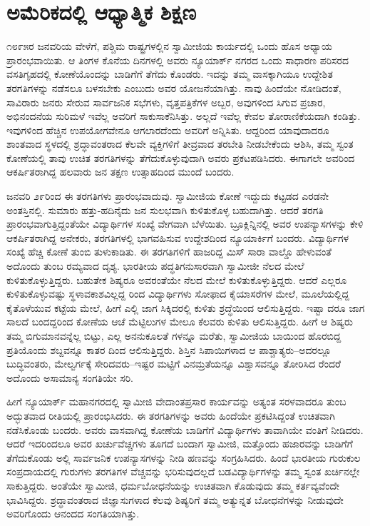 
\chapter{ಅಮೆರಿಕದಲ್ಲಿ ಆಧ್ಯಾತ್ಮಿಕ ಶಿಕ್ಷಣ}

\noindent

೧೮೯೫ರ ಜನವರಿಯ ವೇಳೆಗೆ, ಪಶ್ಚಿಮ ರಾಷ್ಟ್ರಗಳಲ್ಲಿನ ಸ್ವಾಮೀಜಿಯ ಕಾರ್ಯದಲ್ಲಿ ಒಂದು ಹೊಸ ಅಧ್ಯಾಯ ಪ್ರಾರಂಭವಾಯಿತು. ಆ ತಿಂಗಳ ಕೊನೆಯ ದಿನಗಳಲ್ಲಿ ಅವರು ನ್ಯೂಯಾರ್ಕ್ ನಗರದ ಒಂದು ಸಾಧಾರಣ ಪರಿಸರದ ವಸತಿಗೃಹದಲ್ಲಿ ಕೋಣೆಯೊಂದನ್ನು ಬಾಡಿಗೆಗೆ ತೆಗೆದು ಕೊಂಡರು. ಇದನ್ನು ತಮ್ಮ ವಾಸಕ್ಕಾಗಿಯೂ ಉದ್ದೇಶಿತ ತರಗತಿಗಳನ್ನು ನಡೆಸಲೂ ಬಳಸಬೇಕು ಎಂಬುದು ಅವರ ಯೋಜನೆಯಾಗಿತ್ತು. ನಾವು ಹಿಂದೆಯೇ ನೋಡಿದಂತೆ, ಸಾವಿರಾರು ಜನರು ಸೇರುವ ಸಾರ್ವಜನಿಕ ಸಭೆಗಳು, ವೃತ್ತಪತ್ರಿಕೆಗಳ ಅಬ್ಬರ, ಅವುಗಳಿಂದ ಸಿಗುವ ಪ್ರಚಾರ, ಅಭಿನಂದನೆಯ ಸುರಿಮಳೆ ಇವೆಲ್ಲ ಅವರಿಗೆ ಸಾಕುಸಾಕೆನಿಸಿತ್ತು. ಅಲ್ಲದೆ ಇವೆಲ್ಲ ಕೇವಲ ತೋರಾಣಿಕೆಯದಾಗಿ ಕಂಡಿತ್ತು. ಇವುಗಳಿಂದ ಹೆಚ್ಚಿನ ಉಪಯೋಗವೇನೂ ಆಗಲಾರದೆಂದು ಅವರಿಗೆ ಅನ್ನಿಸಿತು. ಆದ್ದರಿಂದ ಯಾವುದಾದರೂ ಶಾಂತವಾದ ಸ್ಥಳದಲ್ಲಿ ಶ್ರದ್ಧಾವಂತರಾದ ಕೆಲವೇ ವ್ಯಕ್ತಿಗಳಿಗೆ ತೀವ್ರವಾದ ತರಬೇತಿ ನೀಡಬೇಕೆಂದು ಆಶಿಸಿ, ತಮ್ಮ ಸ್ವಂತ ಕೋಣೆಯಲ್ಲಿ ತಾವು ಉಚಿತ ತರಗತಿಗಳನ್ನು ತೆಗೆದುಕೊಳ್ಳುವುದಾಗಿ ಅವರು ಪ್ರಕಟಪಡಿಸಿದರು. ಈಗಾಗಲೇ ಅವರಿಂದ ಆಕರ್ಷಿತರಾಗಿದ್ದ ಹಲವಾರು ಜನ ತಕ್ಷಣ ಉತ್ಸಾಹದಿಂದ ಮುಂದೆ ಬಂದರು.

ಜನವರಿ ೨೯ರಿಂದ ಈ ತರಗತಿಗಳು ಪ್ರಾರಂಭವಾದುವು. ಸ್ವಾಮೀಜಿಯ ಕೋಣೆ ಇದ್ದುದು ಕಟ್ಟಡದ ಎರಡನೇ ಅಂತಸ್ತಿನಲ್ಲಿ. ಸುಮಾರು ಹತ್ತು-ಹದಿನೈದು ಜನ ಸುಲಭವಾಗಿ ಕುಳಿತುಕೊಳ್ಳ ಬಹುದಾಗಿತ್ತು. ಆದರೆ ತರಗತಿ ಪ್ರಾರಂಭವಾಗುತ್ತಿದ್ದಂತೆಯೇ ವಿದ್ಯಾರ್ಥಿಗಳ ಸಂಖ್ಯೆ ವೇಗವಾಗಿ ಬೆಳೆಯಿತು. ಬ್ರೂಕ್ಲಿನ್ನಿನಲ್ಲಿ ಅವರ ಉಪನ್ಯಾಸಗಳನ್ನು ಕೇಳಿ ಆಕರ್ಷಿತರಾಗಿದ್ದ ಅನೇಕರು, ತರಗತಿಗಳಲ್ಲಿ ಭಾಗವಹಿಸುವ ಉದ್ದೇಶದಿಂದ ನ್ಯೂಯಾರ್ಕಿಗೆ ಬಂದರು. ವಿದ್ಯಾರ್ಥಿಗಳ ಸಂಖ್ಯೆ ಹೆಚ್ಚಿ ಕೋಣೆ ತುಂಬಿ ತುಳುಕಾಡಿತು. ಈ ತರಗತಿಗಳಿಗೆ ಹಾಜರಿದ್ದ ಮಿಸ್ ಸಾರಾ ವಾಲ್ಡೊ ಹೇಳುವಂತೆ ಅದೊಂದು ತುಂಬ ರಮ್ಯವಾದ ದೃಶ್ಯ. ಭಾರತೀಯ ಪದ್ಧತಿಗನುಸಾರವಾಗಿ ಸ್ವಾಮೀಜೀ ನೆಲದ ಮೇಲೆ ಕುಳಿತುಕೊಳ್ಳುತ್ತಿದ್ದರು. ಬಹುತೇಕ ಶಿಷ್ಯರೂ ಅವರಂತೆಯೇ ನೆಲದ ಮೇಲೆ ಕುಳಿತುಕೊಳ್ಳುತ್ತಿದ್ದರು. ಆದರೆ ಎಲ್ಲರೂ ಕುಳಿತುಕೊಳ್ಳುವಷ್ಟು ಸ್ಥಳಾವಕಾಶವಿಲ್ಲದ್ದ ರಿಂದ ವಿದ್ಯಾರ್ಥಿಗಳು ಸೋಫಾದ ಕೈಯಾಸರೆಗಳ ಮೇಲೆ, ಮೂಲೆಯಲ್ಲಿದ್ದ ಕೈತೊಳೆಯುವ ಕಟ್ಟೆಯ ಮೇಲೆ, ಹೀಗೆ ಎಲ್ಲಿ ಜಾಗ ಸಿಕ್ಕಿದರಲ್ಲಿ ಕುಳಿತು ಶ್ರದ್ಧೆಯಿಂದ ಆಲಿಸುತ್ತಿದ್ದರು. ಇಷ್ಟಾ ದರೂ ಜಾಗ ಸಾಲದೆ ಬಂದದ್ದರಿಂದ ಕೋಣೆಯ ಆಚೆ ಮೆಟ್ಟಿಲುಗಳ ಮೇಲೂ ಕೆಲವರು ಕುಳಿತು ಆಲಿಸುತ್ತಿದ್ದರು. ಹೀಗೆ ಆ ಶಿಷ್ಯರು ತಮ್ಮ ಬಿಗುಮಾನವನ್ನೆಲ್ಲ ಬಿಟ್ಟು, ಎಲ್ಲ ಅನನುಕೂಲತೆ ಗಳನ್ನೂ ಮರೆತು, ಸ್ವಾಮೀಜಿಯ ಬಾಯಿಂದ ಹೊರಬಿದ್ದ ಪ್ರತಿಯೊಂದು ಶಬ್ದವನ್ನೂ ಕಾತರ ದಿಂದ ಆಲಿಸುತ್ತಿದ್ದರು. ಶಿಸ್ತಿನ ಸಿಪಾಯಿಗಳಾದ ಆ ಪಾಶ್ಚಾತ್ಯರು–ಅದರಲ್ಲೂ ಬುದ್ಧಿವಂತರು, ಮೇಲ್ವರ್ಗಕ್ಕೆ ಸೇರಿದವರು–ಇಷ್ಟರ ಮಟ್ಟಿಗೆ ವಿನಮ್ರತೆಯನ್ನೂ ವಿಶ್ವಾಸವನ್ನೂ ತೋರಿಸಿದ ರೆಂದರೆ ಅದೊಂದು ಅಸಾಮಾನ್ಯ ಸಂಗತಿಯೇ ಸರಿ.

ಹೀಗೆ ನ್ಯೂಯಾರ್ಕ್ ಮಹಾನಗರದಲ್ಲಿ ಸ್ವಾಮೀಜಿ ವೇದಾಂತಪ್ರಸಾರ ಕಾರ್ಯವನ್ನು ಅತ್ಯಂತ ಸರಳವಾದರೂ ತುಂಬ ಅದ್ಭುತವಾದ ರೀತಿಯಲ್ಲಿ ಪ್ರಾರಂಭಿಸಿದರು. ಈ ತರಗತಿಗಳನ್ನು ಅವರು ಹಿಂದೆಯೇ ಪ್ರಕಟಿಸಿದ್ದಂತೆ ಉಚಿತವಾಗಿ ನಡೆಸಿಕೊಂಡು ಬಂದರು. ಅವರು ವಾಸವಾಗಿದ್ದ ಕೋಣೆಯ ಬಾಡಿಗೆಗೆ ವಿದ್ಯಾರ್ಥಿಗಳು ತಾವಾಗಿಯೇ ವಂತಿಗೆ ನೀಡಿದರು. ಆದರೆ ಇದರಿಂದಲೂ ಅವರ ಖರ್ಚುವೆಚ್ಚಗಳು ತೂಗದೆ ಬಂದಾಗ ಸ್ವಾಮೀಜಿ, ಮತ್ತೊಂದು ಹಜಾರವನ್ನು ಬಾಡಿಗೆಗೆ ತೆಗೆದುಕೊಂಡು ಅಲ್ಲಿ ಸಾರ್ವಜನಿಕ ಉಪನ್ಯಾಸಗಳನ್ನು ನೀಡಿ ಹಣವನ್ನು ಸಂಗ್ರಹಿಸಿದರು. ಹಿಂದೆ ಭಾರತೀಯ ಗುರುಕುಲ ಸಂಪ್ರದಾಯದಲ್ಲಿ ಗುರುಗಳು ತರಗತಿಗಳ ವೆಚ್ಚವನ್ನು ಭರಿಸುವುದಲ್ಲದೆ ಬಡವಿದ್ಯಾರ್ಥಿಗಳನ್ನು ತಮ್ಮ ಸ್ವಂತ ಖರ್ಚಿನಲ್ಲೇ ಸಾಕುತ್ತಿದ್ದರು. ಅಂತೆಯೇ ಸ್ವಾಮೀಜಿ, ಧರ್ಮಬೋಧನೆಯನ್ನು ಉಚಿತವಾಗಿ ಕೊಡುವುದು ತಮ್ಮ ಕರ್ತವ್ಯವೆಂದೇ ಭಾವಿಸಿದ್ದರು. ಶ್ರದ್ಧಾವಂತರಾದ ಜಿಜ್ಞಾಸುಗಳಾದ ಕೆಲವು ಶಿಷ್ಯರಿಗೆ ತಮ್ಮ ಅತ್ಯುನ್ನತ ಬೋಧನೆಗಳನ್ನು ನೀಡುವುದೇ ಅವರಿಗೊಂದು ಆನಂದದ ಸಂಗತಿಯಾಗಿತ್ತು.

